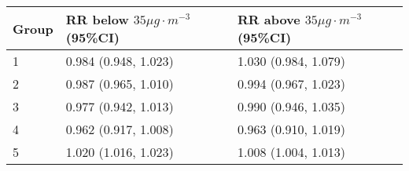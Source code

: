 \begin{tabular}{lll}
  \hline
Group & RR below $35 \mu g \cdot m^{-3}$ (95\%CI) & RR above $35 \mu g \cdot m^{-3}$ (95\%CI) \\ 
  \hline
   1 & 0.984 (0.948, 1.023) & 1.030 (0.984, 1.079) \\ 
     2 & 0.987 (0.965, 1.010) & 0.994 (0.967, 1.023) \\ 
     3 & 0.977 (0.942, 1.013) & 0.990 (0.946, 1.035) \\ 
     4 & 0.962 (0.917, 1.008) & 0.963 (0.910, 1.019) \\ 
     5 & 1.020 (1.016, 1.023) & 1.008 (1.004, 1.013) \\ 
   \hline
\end{tabular}

